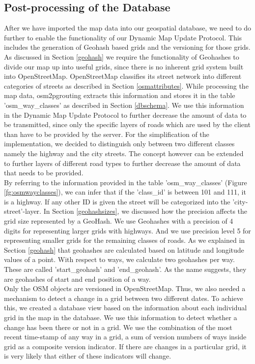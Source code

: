 \subsection{Post-processing of the Database} \label{postprocessing}
After we have imported the map data into our geospatial database, we need to do further to enable the functionality of our Dynamic Map Update Protocol. This includes the generation of Geohash based grids and the versioning for those grids. As discussed in Section \ref{geohash} we require the functionality of Geohashes to divide our map up into useful grids, since there is no inherent grid system built into OpenStreetMap. OpenStreetMap classifies its street network into different categories of streets as described in Section \ref{osmattributes}. While processing the map data, osm2pgrouting extracts this information and stores it in the table 'osm{\_}way{\_}classes' as described in Section \ref{dbschema}. We use this information in the Dynamic Map Update Protocol to further decrease the amount of data to be transmitted, since only the specific layers of roads which are used by the client than have to be provided by the server. For the simplification of the implementation, we decided to distinguish only between two different classes namely the highway and the city streets. The concept however can be extended to further layers of different road types to further decrease the amount of data that needs to be provided. 
\\

By referring to the information provided in the table 'osm{\_}way{\_}classes' (Figure \ref{fg:osmwayclasses}), we can infer that if the 'class{\_}id' is between 101 and 111, it is a highway. If any other ID is given the street will be categorized into the 'city-street'-layer.  In Section \ref{geohashsizes}, we discussed how the precision affects the grid size represented by a GeoHash. We use Geohashes with a precision of 4 digits for representing larger grids with highways. And we use precision level 5 for representing smaller grids for the remaining classes of roads. As we explained in Section \ref{geohash} that geohashes are calculated based on latitude and longitude values of a point. With respect to ways, we calculate two geohashes per way. These are called 'start{\_}geohash' and 'end{\_}geohash'. As the name suggests, they are geohashes of start and end position of a way.
\\

Only the OSM objects are versioned in OpenStreetMap. Thus, we also needed a mechanism to detect a change in a grid between two different dates. To achieve this, we created a database view based on the information about each individual grid in the map in the database. We use this information to detect whether a change has been there or not in a grid. We use the combination of the most recent time-stamp of any way in a grid, a sum of version numbers of ways inside grid as a composite version indicator. If there are changes in a particular grid, it is very likely that either of these indicators will change.
\\

